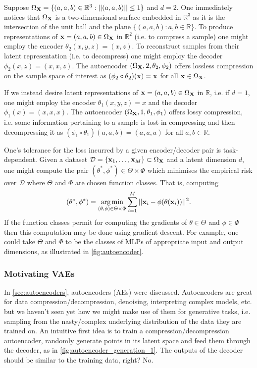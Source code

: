 \documentclass[11pt]{article}
\begin{document}
\begin{example}
    Suppose $\Omega_{\mathbf{X}}=\{(a,a,b)\in\mathbb{R}^3:||(a,a,b)||\leq1\}$ and $d=2$. One immediately notices that $\Omega_{\mathbf{X}}$ is a two-dimensional surface embedded in $\mathbb{R}^3$ as it is the intersection of the unit ball and the plane $\{(a,a,b):a,b\in\mathbb{R}\}$. To produce representations of $\mathbf{x}=(a,a,b)\in\Omega_{\mathbf{X}}$ in $\mathbb{R}^2$ (i.e. to compress a sample) one might employ the encoder $\theta_2(x,y,z)=(x,z)$. To reconstruct samples from their latent representation (i.e. to decompress) one might employ the decoder $\phi_2(x,z)=(x,x,z)$. The autoencoder $(\Omega_{\mathbf{X}},2,\theta_2,\phi_2)$ offers lossless compression on the sample space of interest as $(\phi_2\circ\theta_2)(\mathbf{x})=\mathbf{x}$ for all $\mathbf{x}\in\Omega_{\mathbf{X}}$.

    If we instead desire latent representations of $\mathbf{x}=(a,a,b)\in\Omega_{\mathbf{X}}$ in $\mathbb{R}$, i.e. if $d=1$, one might employ the encoder $\theta_1(x,y,z)=x$ and the decoder $\phi_1(x)=(x,x,x)$. The autoencoder $(\Omega_{\mathbf{X}},1,\theta_1,\phi_1)$ offers lossy compression, i.e. some information pertaining to a sample is lost in compressing and then decompressing it as $(\phi_1\circ\theta_1)(a,a,b)=(a,a,a)$ for all $a,b\in\mathbb{R}$.
\end{example}

One's tolerance for the loss incurred by a given encoder/decoder pair is task-dependent. Given a dataset $\mathcal{D}=\{\mathbf{x}_1,\dots,\mathbf{x}_M\}\subset\Omega_{\mathbf{X}}$ and a latent dimension $d$, one might compute the pair $(\theta^*,\phi^*)\in\Theta\times\Phi$ which minimises the empirical risk over $\mathcal{D}$ where $\Theta$ and $\Phi$ are chosen function classes. That is, computing
$$
(\theta^*,\phi^*)
=
\operatorname*{arg\,min}_{(\theta,\phi)\in\Theta\times\Phi}
\sum_{i=1}^M||\mathbf{x}_i-\phi(\theta(\mathbf{x}_i))||^2.
$$
If the function classes permit for computing the gradients of $\theta\in\Theta$ and $\phi\in\Phi$ then this computation may be done using gradient descent. For example, one could take $\Theta$ and $\Phi$ to be the classes of MLPs of appropriate input and output dimensions, as illustrated in \autoref{fig:autoencoder}.

\subsubsection*{Motivating VAEs}
In \autoref{sec:autoencoders}, autoencoders (AEs) were discussed. Autoencoders are great for data compression/decompression, denoising, interpreting complex models, etc. but we haven't seen yet how we might make use of them for generative tasks, i.e. sampling from the nasty/complex underlying distribution of the data they are trained on. An intuitive first idea is to train a compression/decompression autoencoder, randomly generate points in its latent space and feed them through the decoder, as in \autoref{fig:autoencoder_generation_1}. The outputs of the decoder should be similar to the training data, right? No.
\end{document}
